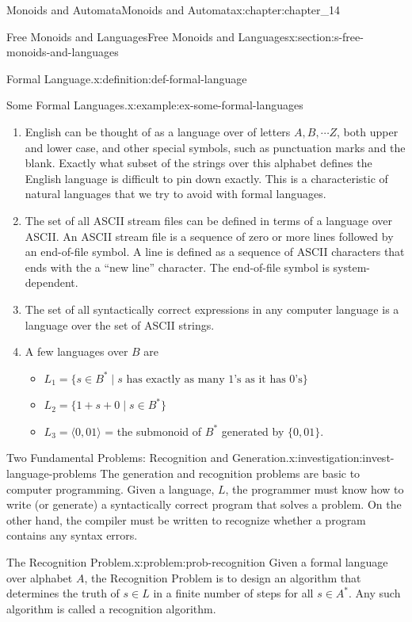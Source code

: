 \documentclass[oneside,10pt,]{book}
\numberwithin{equation}{section}
\begin{document}
\begin{chapterptx}{Monoids and Automata}{}{Monoids and Automata}{}{}{x:chapter:chapter_14}
\begin{sectionptx}{Free Monoids and Languages}{}{Free Monoids and Languages}{}{}{x:section:s-free-monoids-and-languages}
\begin{definition}{Formal Language.}{x:definition:def-formal-language}
\end{definition}
\begin{example}{Some Formal Languages.}{x:example:ex-some-formal-languages}%
%
\begin{enumerate}[label=(\alph*)]
\item{}English can be thought of as a language over of letters \(A,B,\cdots Z\), both upper and lower case,	and other special symbols, such as punctuation marks and the blank. Exactly what subset of the strings over this alphabet defines the English language is difficult to pin down exactly. This is a characteristic of natural languages that we try to avoid with formal languages.%
\item{}The set of all ASCII stream files can be defined in terms of a language over ASCII. An ASCII stream file is a sequence of zero or more lines followed by an end-of-file symbol. A line is defined as a sequence of ASCII characters that ends with the a ``new line'' character. The end-of-file symbol is system-dependent.%
\item{}The set of all syntactically correct expressions in any computer language is a language over the set of ASCII strings.%
\item{}A few languages over \(B\) are%
\begin{itemize}[label=\textbullet]
\item{}\(L_1=\{s\in B^* \mid s \textrm{  has  exactly  as many 1's as it  has 0's}\}\)%
\item{}\(L_2=\{1+s+0 \mid s\in B^*\}\)%
\item{}\(L_3=\langle 0,01\rangle\) = the submonoid of \(B^*\) generated by \(\{0,01\}\).%
\end{itemize}
%
\end{enumerate}
%
\end{example}
\begin{investigation}{Two Fundamental Problems: Recognition and Generation.}{x:investigation:invest-language-problems}%
The generation and recognition problems are basic to computer programming. Given a language, \(L\), the programmer must know how to write (or generate) a syntactically correct program that solves a problem. On the other hand, the compiler must be written to recognize whether a program contains any syntax errors.%
\end{investigation}
\begin{problem}{The Recognition Problem.}{x:problem:prob-recognition}%
Given a formal language over alphabet \(A\), the Recognition Problem is to design an algorithm that determines the truth of \(s\in L\) in a finite number of steps for all \(s\in A^*\). Any such algorithm is called a recognition algorithm.%

\end{problem}
\end{sectionptx}
\end{chapterptx}
\end{document}
